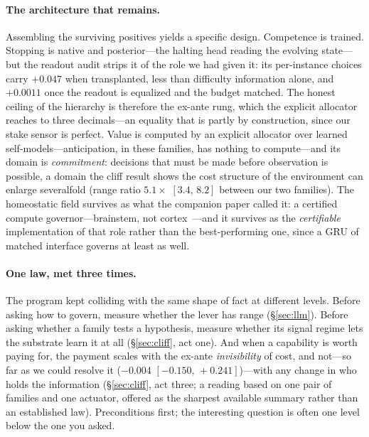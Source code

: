 \documentclass{article}
\newcommand{\Yinfo}{$+0.047$} \newcommand{\YinfoIC}{$[+0.029,\,+0.065]$}
\newcommand{\Rasign}{$+0.0011$} \newcommand{\RasignIC}{$[+0.0003,\,+0.0019]$}
\newcommand{\FracDif}{$-0.004$} \newcommand{\FracDifIC}{$[-0.150,\,+0.241]$}
\newcommand{\RatioRangos}{$5.1\times$} \newcommand{\RatioRangosIC}{$[3.4,\,8.2]$}
\newcommand{\compcite}{\citep{anon2026governor}}
\newcommand{\compcite}{\citep{arrabal2026governor}}
\begin{document}
\paragraph{The architecture that remains.} Assembling the surviving
positives yields a specific design. Competence is trained. Stopping is
native and posterior---the halting head reading the evolving state---but the
readout audit strips it of the role we had given it: its per-instance
choices carry \Yinfo{} when transplanted, less than difficulty information
alone, and \Rasign{} once the readout is equalized and the budget matched.
The honest ceiling of the hierarchy is therefore the ex-ante rung, which the
explicit allocator reaches to three decimals---an equality that is partly by
construction, since our stake sensor is perfect. Value is computed by an explicit allocator
over learned self-models---anticipation, in these families, has nothing to
compute---and its domain is \emph{commitment}: decisions
that must be made before observation is possible, a domain the cliff result
shows the cost structure of the environment can enlarge severalfold (range
ratio \RatioRangos{} \RatioRangosIC{} between our two families). The homeostatic field survives as what the companion paper
called it: a certified compute governor---brainstem, not
cortex~\compcite{}---and it survives as the \emph{certifiable}
implementation of that role rather than the best-performing one, since a GRU
of matched interface governs at least as well.

\paragraph{One law, met three times.} The program kept colliding with the
same shape of fact at different levels. Before asking how to govern, measure
whether the lever has range (\S\ref{sec:llm}). Before asking whether a
family tests a hypothesis, measure whether its signal regime lets the
substrate learn it at all (\S\ref{sec:cliff}, act one). And when a
capability is worth paying for, the payment scales with the ex-ante
\emph{invisibility} of cost, and not---so far as we could resolve it
(\FracDif{} \FracDifIC)---with any change in who holds the
information (\S\ref{sec:cliff}, act three; a reading based on one pair of
families and one actuator, offered as the sharpest available summary
rather than an established law). Preconditions first; the
interesting question is often one level below the one you asked.
\end{document}
